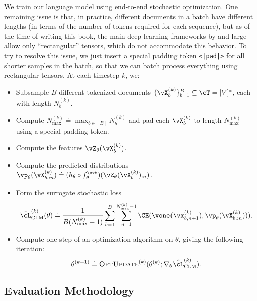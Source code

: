 \documentclass[../../book-main.tex]{subfiles}
\begin{document}
We train our language model using end-to-end stochastic optimization. One remaining issue is that, in practice, different documents in a batch have different lengths (in terms of the number of tokens required for each sequence), but as of the time of writing this book, the main deep learning frameworks by-and-large allow only ``rectangular'' tensors, which do not accommodate this behavior. To try to resolve this issue, we just insert a special padding token \texttt{<|pad|>} for all shorter samples in the batch, so that we can batch process everything using rectangular tensors. At each timestep \(k\), we:
\begin{itemize}
    \item Subsample \(B\) different tokenized documents \(\{\vX_{b}^{(k)}\}_{b = 1}^{B} \subseteq \cT = [V]^{*}\), each with length \(N_{b}^{(k)}\).
    \item Compute \(N_{\max}^{(k)} \doteq \max_{b \in [B]}N_{b}^{(k)}\) and pad each \(\vX_{b}^{(k)}\) to length \(N_{\max}^{(k)}\) using a special padding token.
    \item Compute the features \(\vZ_{\theta}(\vX_{b}^{(k)})\).
    \item Compute the predicted distributions \(\vp_{\theta}(\vX_{b, :n}^{(k)}) \doteq (h_{\theta} \circ f_{\theta}^{\ext})(\vZ_{\theta}(\vX_{b}^{(k)})_{:n})\).
    \item Form the surrogate stochastic loss 
    \begin{equation}
        \hat{\cL}_{\mathrm{CLM}}^{(k)}(\theta) \doteq \frac{1}{B(N_{\max}^{(k)} - 1)}\sum_{b = 1}^{B}\sum_{n = 1}^{N_{\max}^{(k)}-1}\CE(\vone(\vx_{b, n + 1}^{(k)}), \vp_{\theta}(\vX_{b, :n}^{(k)}))).
    \end{equation}
    \item Compute one step of an optimization algorithm on \(\theta\), giving the following iteration:
    \begin{equation}
        \theta^{(k + 1)} \doteq \textsc{OptUpdate}^{(k)}(\theta^{(k)}; \nabla_{\theta}\hat{\cL}_{\mathrm{CLM}}^{(k)}).
    \end{equation}
\end{itemize}

\subsection{Evaluation Methodology} \label{sub:clm_text_evals}
\end{document}
